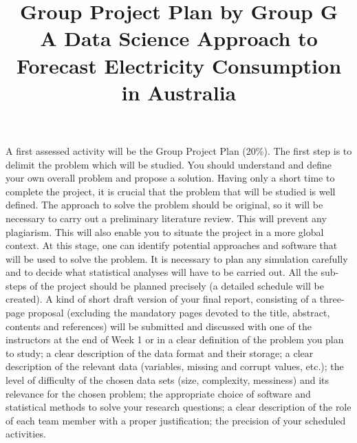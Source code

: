 \documentclass[mstat,12pt]{unswthesis}
\title{Group Project Plan by Group G\\[0.5cm]A Data Science Approach to
Forecast Electricity Consumption in Australia}
\author{\Authornameonly}
\begin{document}
\beforepreface


A first assessed activity will be the Group Project Plan (20\%). The
first step is to delimit the problem which will be studied. You should
understand and define your own overall problem and propose a solution.
Having only a short time to complete the project, it is crucial that the
problem that will be studied is well defined. The approach to solve the
problem should be original, so it will be necessary to carry out a
preliminary literature review. This will prevent any plagiarism. This
will also enable you to situate the project in a more global context. At
this stage, one can identify potential approaches and software that will
be used to solve the problem. It is necessary to plan any simulation
carefully and to decide what statistical analyses will have to be
carried out. All the sub-steps of the project should be planned
precisely (a detailed schedule will be created). A kind of short draft
version of your final report, consisting of a three-page proposal
(excluding the mandatory pages devoted to the title, abstract, contents
and references) will be submitted and discussed with one of the
instructors at the end of Week 1 or in a clear definition of the problem
you plan to study; a clear description of the data format and their
storage; a clear description of the relevant data (variables, missing
and corrupt values, etc.); the level of difficulty of the chosen data
sets (size, complexity, messiness) and its relevance for the chosen
problem; the appropriate choice of software and statistical methods to
solve your research questions; a clear description of the role of each
team member with a proper justification; the precision of your scheduled
activities.



\afterpreface





%
%






\setcounter{chapter}{1}
\renewcommand\thesection{\arabic{section}}
\end{document}
